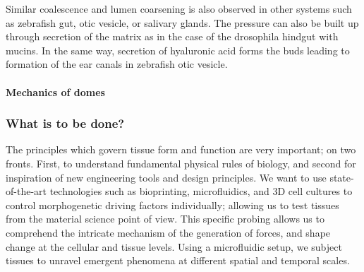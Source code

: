 \documentclass[
]{article}
\begin{document}
Similar coalescence and lumen coarsening is also observed in other
systems such as zebrafish gut, otic vesicle, or salivary glands. The
pressure can also be built up through secretion of the matrix as in the
case of the drosophila hindgut with mucins. In the same way, secretion
of hyaluronic acid forms the buds leading to formation of the ear canals
in zebrafish otic vesicle.

\hypertarget{mechanics-of-domes}{%
\paragraph{Mechanics of domes}\label{mechanics-of-domes}}

\hypertarget{what-is-to-be-done}{%
\subsubsection{What is to be done?}\label{what-is-to-be-done}}

The principles which govern tissue form and function are very important;
on two fronts. First, to understand fundamental physical rules of
biology, and second for inspiration of new engineering tools and design
principles. We want to use state-of-the-art technologies such as
bioprinting, microfluidics, and 3D cell cultures to control
morphogenetic driving factors individually; allowing us to test tissues
from the material science point of view. This specific probing allows us
to comprehend the intricate mechanism of the generation of forces, and
shape change at the cellular and tissue levels. Using a microfluidic
setup, we subject tissues to unravel emergent phenomena at different
spatial and temporal scales.
\end{document}
